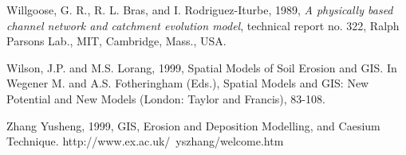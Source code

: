 \documentclass{kapedbk} %
\begin{document}
\begin{chapthebibliography}{1}
{\bibitem{}
Willgoose, G. R., R. L. Bras, and I. Rodriguez-Iturbe, 1989,
{\it A physically based channel network and catchment
evolution model}, technical report no. 322, Ralph Parsons Lab., MIT, Cambridge,
Mass., USA.

\bibitem{}
Wilson, J.P. and M.S. Lorang, 1999, Spatial Models of Soil Erosion and GIS. 
In Wegener M. and A.S. Fotheringham (Eds.), Spatial Models and GIS: 
New Potential and New Models (London: Taylor and Francis), 83-108.

\bibitem{}
Zhang Yusheng, 1999, GIS, Erosion and Deposition Modelling, 
and Caesium Technique.
http://www.ex.ac.uk/~yszhang/welcome.htm

\bibitem{} 

}
\end{chapthebibliography}
\end{document}
